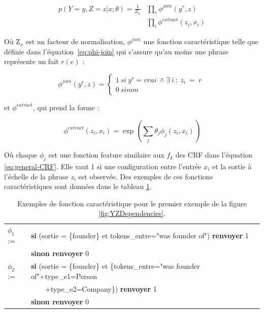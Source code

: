 \documentclass[12pt,a4paper,times,twoside,openright]{report}
\begin{document}
\begin{equation} \label{eq:joint-conditional-probability}
\begin{aligned}
p(Y=y,Z=z|x;\theta) = \frac{1}{Z_x} & \prod_r \phi^{join} (y^r,z) \\
                                    & \prod_i\phi^{extract} (z_i,x_i)
\end{aligned}
\end{equation}

Où Z$_{x}$ est un facteur de normalisation, $\phi^{join}$ une fonction caractéristique telle que définie dans l'équation\ \ref{eq:phi-join} qui s'assure qu'au moins une phrase représente un fait $r(e)$ :

\begin{equation} \label{eq:phi-join}
\phi^{join} (y^r,z) = \left\{
  \begin{array}{lr}
    1\ si\ y^r=vrai\ \wedge \exists\ i\ :\ z_i\ =\ r\ \\
    0\ sinon
  \end{array}
\right.
\end{equation}

et $\phi^{extract}$, qui prend la forme :

\begin{equation} \label{eq:phi-extract}
\phi^{extract} (z_{i},x_{i}) = \exp \left( \sum_{j} \theta_{j} \phi_{j} (z_{i},x_{i}) \right)
\end{equation}

Où chaque $\phi_{j}$ est une fonction feature similaire aux $f_{k}$ des CRF dans l'équation \ref{eq:general-CRF}. Elle vaut 1 si une configuration entre l'entrée $x_{i}$ et la sortie à l'échelle de la phrase $z_{i}$ est observée. Des exemples de ces fonctions caractéristiques sont données dans le tableau \ref{tab:multir-feature-function-example}.

\begin{table}[ht!]
\begin{tabular}{ll}
$\phi_{1}$ := & \textbf{si} (sortie = \{founder\} et tokens\_entre="was founder of") \textbf{renvoyer} 1 \\
              & \textbf{sinon renvoyer} 0 \\
$\phi_{2}$ := & \textbf{si} (sortie = \{founder\} et \{tokens\_entre="was founder of"+type\_e1=Person \\
              & \ \ \ \ +type\_e2=Company\}) \textbf{renvoyer} 1 \\
              & \textbf{sinon renvoyer} 0 \\
\end{tabular}
\caption{Exemples de fonction caractéristique pour le premier exemple de la figure \ref{fig:YZDependencies}.}
\label{tab:multir-feature-function-example}
\end{table}
\end{document}

